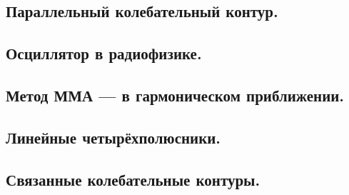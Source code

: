 \documentclass[../main/main.tex]{subfiles}
\begin{document}
\subsection{Параллельный колебательный контур.}

\subsection{Осциллятор в радиофизике.}

\subsection{Метод ММА --- в гармоническом приближении.}

\subsection{Линейные четырёхполюсники.}

\subsection{Связанные колебательные контуры.}
\end{document}
